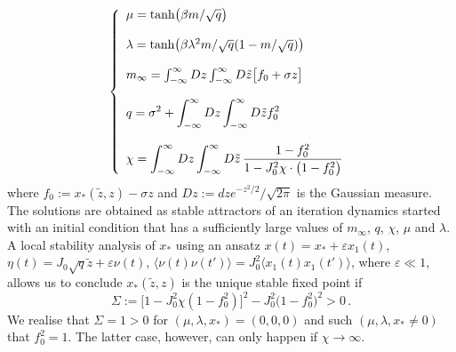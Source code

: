 \documentclass[%
 reprint,
superscriptaddress,
 amsmath,amssymb,
 prl,
]{revtex4-2}
\begin{document}
 \begin{equation}
 \left \{ \begin{array}{l} \displaystyle
 \mu = {\rm tanh} \big(\beta m/\sqrt{q}\big) \\  \\ \lambda = {\rm tanh} \big(\beta \lambda^2 m/\sqrt{q} (1- m/\sqrt{q})\big) \\ \\  m_\infty= \int_{-\infty}^{\infty}  Dz   \int_{-\infty}^{\infty} D\tilde{z}  \big[f_0+ \sigma z \big]  \\ \\ \displaystyle
   q = \sigma^2 + \int_{-\infty}^{\infty} Dz \int_{-\infty}^{\infty} D\tilde{z} f_0 ^2  \\  \\
   \chi = \displaystyle \int_{-\infty}^{\infty}  Dz  \int_{-\infty}^{\infty}  D\tilde{z} \, \frac{1-f_0^2}{1-J_0^2\chi\cdot\big(1-f_0^2\big) } 
  \end{array} \right.\, 
     \label{closed2}
\end{equation}
where  $f_0 := x_*(\tilde{z},z) - \sigma z$ and $Dz := dz e^{-z^2/2}/\sqrt{2\pi}$ is the Gaussian measure. The solutions are obtained as stable attractors of  an iteration dynamics 
started with an initial condition  that has a sufficiently large values of $m_\infty$, $q$,  $ \chi$, $\mu$ and $\lambda$. A local stability analysis of $x_*$ using an ansatz $x(t) = x_* +\varepsilon x_1(t)$,  $\eta(t) = J_0\sqrt{q} \tilde{z} +\varepsilon \nu(t)$, $\langle \nu(t) \nu(t')\rangle = J_0^2 \langle x_1(t) x_1(t')\rangle$, where $\varepsilon \ll 1$, allows us to conclude  $x_*(\tilde{z},z)$ is the unique   stable fixed point if 
\begin{equation}
\Sigma := \Big[1 - J_0^2\chi(1-f_0^2)\Big]^2 - J_0^2 \big(1-f_0^2\big)^2 > 0\,.
\label{Jacobian_fixed_point_of_closed1}
\end{equation}
 We realise that $\Sigma =1 > 0$ for $(\mu, \lambda, x_*) = (0,0,0)$ and such  $(\mu, \lambda, x_* \neq 0)$ that $f_0^2 =1$. The latter case, however, can only happen if $\chi \rightarrow \infty$. 




\end{document}
